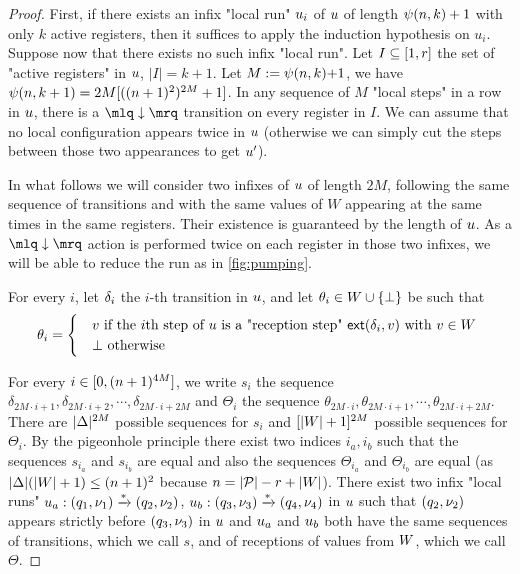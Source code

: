 \begin{proof}
	
	First, if there exists an infix "local run" $u_i$ of $u$ of length $\psi(n,k)+1$ with only $k$ active registers, then it suffices to apply the induction hypothesis on $u_i$.
	Suppose now that there exists no such infix "local run".
	Let $I \subseteq [1,r]$ the set of "active registers" in $u$, $|I| = k+1$. Let $M:= \psi(n,k){+}1$, we have $\psi(n,k+1) = 2M [((n+1)^2)^{2M}+1]$. 
	In any sequence of $M$ "local steps" in a row in $u$, 
	there is a $\quotemarks{\enregact}$ transition on every register in $I$. We can assume that  no local configuration appears twice in $u$ (otherwise we can simply cut the steps between those two appearances to get $u'$). 
	
	In what follows we will consider two infixes of $u$ of length $2M$, following the same sequence of transitions and with the same values of $W$ appearing at the same times in the same registers. Their existence is guaranteed by the length of $u$. As a $\quotemarks{\enregact}$ action is performed twice on each register in those two infixes, we will be able to reduce the run as in \cref{fig:pumping}.
	
	For every $i$, let $\delta_i$ the $i$-th transition in $u$, and let $\theta_i\in W \cup \{\bot\}$ be such that 
	\[
	\theta_i = 
	\begin{cases}
		& 	v \text{ if the $i$th step of $u$ is a "reception step" $\mathsf{ext}(\delta_i,v)$ with $v \in W$ } \\ 
		& 	\bot \text{ otherwise}
	\end{cases}
	\]

	For every $i \in [0,(n+1)^{4M}]$, we write $s_i$ the sequence $\delta_{2  M \cdot i+1}, \delta_{2  M \cdot i+2}, \cdots, \delta_{2 M \cdot i+2M}$ and $\Theta_i$ the sequence $\theta_{2  M \cdot i}, \theta_{2 M \cdot i+1}, \cdots, \theta_{2 M \cdot i+2M}$.
	There are $|\Delta|^{2M}$ possible sequences for $s_i$ and $[|W| +1]^{2M}$ possible sequences for $\Theta_i$.
	By the pigeonhole principle there exist two indices $i_a, i_b$ such that the sequences $s_{i_a}$ and $s_{i_b}$ are equal and also the sequences $\Theta_{i_a}$ and $\Theta_{i_b}$ are equal (as $|\Delta| (|W|+1) \leq (n+1)^2$ because $n=|\mathcal{P}| -r + |W|$). 
	There exist two infix "local runs" $u_a: (q_1, \nu_1) \xrightarrow{*} (q_2, \nu_2)$, $u_b: (q_3, \nu_3) \xrightarrow{*} (q_4, \nu_4)$ in $u$ such that $(q_2,\nu_2)$ appears strictly before $(q_3,\nu_3)$ in $u$ and $u_a$ and $u_b$ both have the same sequences of transitions, which we call $s$, and of receptions of values from $W$, which we call $\Theta$.
	

\end{proof}
